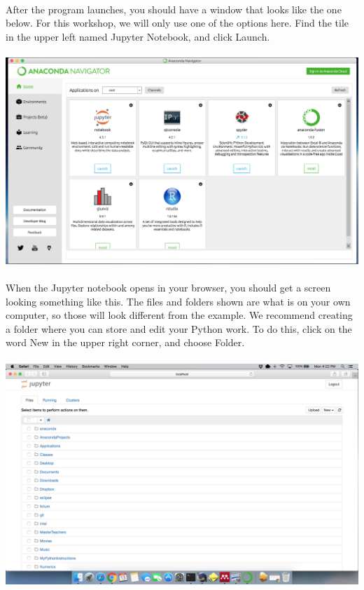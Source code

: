 \documentclass[]{article}
\begin{document}
\paragraph{}
After the program launches, you should have a window that looks like the one below. For this workshop, we will only use one of the options here. Find the tile in the upper left named Jupyter Notebook, and click Launch.
\paragraph{}
\begin{centering}
    \centerline{\includegraphics[scale=0.25]{Screenshot_14.png}}
\end{centering}

\clearpage
\paragraph{}
When the Jupyter notebook opens in your browser, you should get a screen looking something like this. The files and folders shown are what is on your own computer, so those will look different from the example. We recommend creating a folder where you can store and edit your Python work. To do this, click on the word New in the upper right corner, and choose Folder.
\paragraph{}
\begin{centering}
    \centerline{\includegraphics[scale=0.25]{Screenshot_16.png}}
\end{centering}
\end{document}

